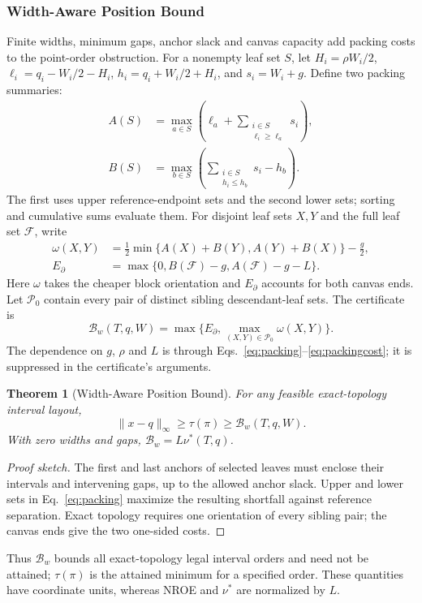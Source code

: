 \documentclass{vgtc}                %
\newtheorem{theorem}{Theorem}
\begin{document}
\subsubsection{Width-Aware Position Bound}
Finite widths, minimum gaps, anchor slack and canvas capacity add packing costs to the point-order obstruction. For a nonempty leaf set $S$, let $H_i=\rho W_i/2$, $\ell_i=q_i-W_i/2-H_i$, $h_i=q_i+W_i/2+H_i$, and $s_i=W_i+g$. Define two packing summaries:
\begin{equation}\label{eq:packing}
\begin{aligned}
 A(S)&=\max_{a\in S}\left(\ell_a+\sum_{\substack{i\in S\\\ell_i\ge\ell_a}}s_i\right),\\
 B(S)&=\max_{b\in S}\left(\sum_{\substack{i\in S\\h_i\le h_b}}s_i-h_b\right).
\end{aligned}
\end{equation}
The first uses upper reference-endpoint sets and the second lower sets; sorting and cumulative sums evaluate them. For disjoint leaf sets $X,Y$ and the full leaf set $\mathcal{F}$, write
\begin{equation}\label{eq:packingcost}
\begin{aligned}
 \omega(X,Y)&=\tfrac12\min\{A(X)+B(Y),A(Y)+B(X)\}-\tfrac g2,\\
 E_\partial&=\max\{0,B(\mathcal{F})-g,A(\mathcal{F})-g-L\}.
\end{aligned}
\end{equation}
Here $\omega$ takes the cheaper block orientation and $E_\partial$ accounts for both canvas ends. Let $\mathcal{P}_0$ contain every pair of distinct sibling descendant-leaf sets. The certificate is
\begin{equation}\label{eq:bwdef}
 \mathcal{B}_w(T,q,W)=\max\{E_\partial,\max_{(X,Y)\in\mathcal{P}_0}\omega(X,Y)\}.
\end{equation}
The dependence on $g$, $\rho$ and $L$ is through Eqs.~\ref{eq:packing}--\ref{eq:packingcost}; it is suppressed in the certificate's arguments.
\begin{theorem}[Width-Aware Position Bound]\label{thm:width}
For any feasible exact-topology interval layout,
\begin{equation}\label{eq:widthbound}
 \|x-q\|_\infty\ge\tau(\pi)\ge\mathcal{B}_w(T,q,W).
\end{equation}
With zero widths and gaps, $\mathcal{B}_w=L\nu^*(T,q)$.
\end{theorem}
\begin{proof}[Proof sketch]
The first and last anchors of selected leaves must enclose their intervals and intervening gaps, up to the allowed anchor slack. Upper and lower sets in Eq.~\ref{eq:packing} maximize the resulting shortfall against reference separation. Exact topology requires one orientation of every sibling pair; the canvas ends give the two one-sided costs.
\end{proof}
Thus $\mathcal{B}_w$ bounds all exact-topology legal interval orders and need not be attained; $\tau(\pi)$ is the attained minimum for a specified order. These quantities have coordinate units, whereas NROE and $\nu^*$ are normalized by $L$.
\end{document}
